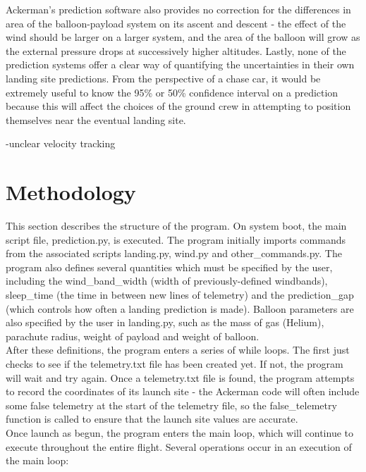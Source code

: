 \documentclass[11pt]{article}
\begin{document}
Ackerman's prediction software also provides no correction for the differences in area of the balloon-payload system on its ascent and descent - the effect of the wind should be larger on a larger system, and the area of the balloon will grow as the external pressure drops at successively higher altitudes. Lastly, none of the prediction systems offer a clear way of quantifying the uncertainties in their own landing site predictions. From the perspective of a chase car, it would be extremely useful to know the 95\% or 50\% confidence interval on a prediction because this will affect the choices of the ground crew in attempting to position themselves near the eventual landing site.

-unclear velocity tracking

\section{Methodology}

This section describes the structure of the program. On system boot, the main script file, prediction.py, is executed. The program initially imports commands from the associated scripts landing.py, wind.py and other\_commands.py. The program also defines several quantities which must be specified by the user, including the wind\_band\_width (width of previously-defined windbands), sleep\_time (the time in between new lines of telemetry) and the prediction\_gap (which controls how often a landing prediction is made). Balloon parameters are also specified by the user in landing.py, such as the mass of gas (Helium), parachute radius, weight of payload and weight of balloon. \\

After these definitions, the program enters a series of while loops. The first just checks to see if the telemetry.txt file has been created yet. If not, the program will wait and try again. Once a telemetry.txt file is found, the program attempts to record the coordinates of its launch site - the Ackerman code will often include some false telemetry at the start of the telemetry file, so the false\_telemetry function is called to ensure that the launch site values are accurate. \\

Once launch as begun, the program enters the main loop, which will continue to execute throughout the entire flight. Several operations occur in an execution of the main loop:
\end{document}
